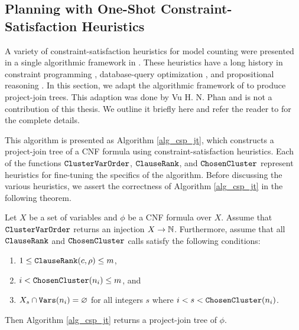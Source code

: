 \subsection{Planning with One-Shot Constraint-Satisfaction Heuristics}
\label{sec_csp}

A variety of constraint-satisfaction heuristics for model counting were presented in a single algorithmic framework in  \cite{DPV20,phan2019weighted}.
These heuristics have a long history in constraint programming \cite{dechter03}, database-query optimization \cite{MPPV04}, and propositional reasoning \cite{pan2005symbolic}.
In this section, we adapt the algorithmic framework of  to produce project-join trees.
This adaption was done by Vu H. N. Phan and is not a contribution of this thesis. We outline it briefly here and refer the reader to \cite{dudek2020dpmc} for the complete details.

This algorithm is presented as Algorithm \ref{alg_csp_jt}, which constructs a project-join tree of a CNF formula using constraint-satisfaction heuristics.
Each of the functions $\texttt{\upshape ClusterVarOrder}$, $\texttt{\upshape ClauseRank}$, and $\texttt{\upshape ChosenCluster}$ represent heuristics for fine-tuning the specifics of the algorithm.
Before discussing the various heuristics, we assert the correctness of Algorithm \ref{alg_csp_jt} in the following theorem.
\begin{theorem}
\label{thm_csp_jt}
    Let $X$ be a set of variables and $\phi$ be a CNF formula over $X$.
    Assume that $\texttt{\upshape ClusterVarOrder}$ returns an injection $X \to \mathbb{N}$.
    Furthermore, assume that all $\texttt{\upshape ClauseRank}$ and $\texttt{\upshape ChosenCluster}$ calls satisfy the following conditions:
    \begin{enumerate}[ref=\arabic*]
        \item $1 \le \texttt{\upshape ClauseRank}(c, \rho) \le m$, \label{cond1}
        \item $i < \texttt{\upshape ChosenCluster}(n_i) \le m$, and \label{cond2}
        \item $X_s \cap \texttt{\upshape Vars}(n_i) = \varnothing$ for all integers $s$ where $i < s < \texttt{\upshape ChosenCluster}(n_i)$. \label{cond3}
    \end{enumerate}
    Then Algorithm \ref{alg_csp_jt} returns a project-join tree of $\phi$.
\end{theorem}


